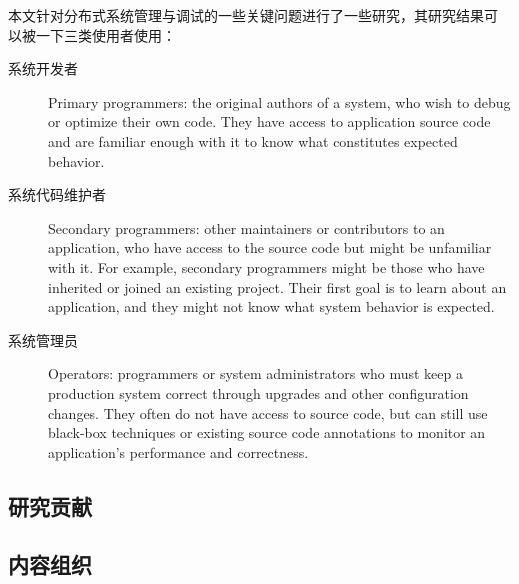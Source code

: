 本文针对分布式系统管理与调试的一些关键问题进行了一些研究，其研究结果可
以被一下三类使用者使用：

\begin{description}

\item[系统开发者] Primary programmers: the original authors of a system, who
wish to debug or optimize their own code. They have access to
application source code and are familiar enough with it to know what
constitutes expected behavior.

\item[系统代码维护者] Secondary programmers: other maintainers or
contributors to an application, who have access to the source code but
might be unfamiliar with it. For example, secondary programmers might
be those who have inherited or joined an existing project. Their first
goal is to learn about an application, and they might not know what
system behavior is expected.

\item[系统管理员] Operators: programmers or system administrators who
must keep a production system correct through upgrades and other
configuration changes. They often do not have access to source code,
but can still use black-box techniques or existing source code
annotations to monitor an application's performance and correctness.

\end{description}

\subsection{研究贡献}

\subsection{内容组织}

